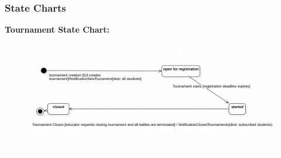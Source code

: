 \subsubsection{State Charts}
\textbf{Tournament State Chart:}
\begin{figure}[h]
    \centering
    \includegraphics[width=1\textwidth]{RASD/2Overall_Description/res/st1.png}
\end{figure}
